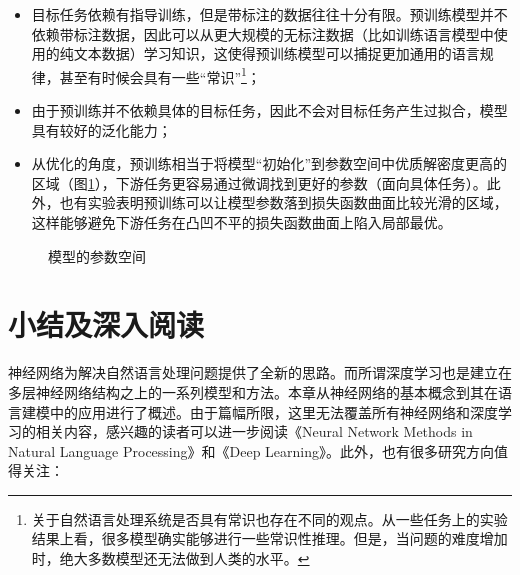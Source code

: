 \begin{itemize}
\vspace{0.5em}
\item 目标任务依赖有指导训练，但是带标注的数据往往十分有限。预训练模型并不依赖带标注数据，因此可以从更大规模的无标注数据（比如训练语言模型中使用的纯文本数据）学习知识，这使得预训练模型可以捕捉更加通用的语言规律，甚至有时候会具有一些``常识''\footnote{关于自然语言处理系统是否具有常识也存在不同的观点。从一些任务上的实验结果上看，很多模型确实能够进行一些常识性推理。但是，当问题的难度增加时，绝大多数模型还无法做到人类的水平。}；
\vspace{0.5em}
\item 由于预训练并不依赖具体的目标任务，因此不会对目标任务产生过拟合，模型具有较好的泛化能力；
\vspace{0.5em}
\item 从优化的角度，预训练相当于将模型``初始化''到参数空间中优质解密度更高的区域（图\ref{fig:5-73}），下游任务更容易通过微调找到更好的参数（面向具体任务）。此外，也有实验表明预训练可以让模型参数落到损失函数曲面比较光滑的区域，这样能够避免下游任务在凸凹不平的损失函数曲面上陷入局部最优。
\vspace{0.5em}
\end{itemize}

\begin{figure}[htp]
\centering

\caption{模型的参数空间}
\label{fig:5-73}
\end{figure}


\sectionnewpage
\section{小结及深入阅读}

\parinterval  神经网络为解决自然语言处理问题提供了全新的思路。而所谓深度学习也是建立在多层神经网络结构之上的一系列模型和方法。本章从神经网络的基本概念到其在语言建模中的应用进行了概述。由于篇幅所限，这里无法覆盖所有神经网络和深度学习的相关内容，感兴趣的读者可以进一步阅读《Neural Network Methods in Natural Language Processing》\cite{goldberg2017neural}和《Deep Learning》\cite{Goodfellow-et-al-2016}。此外，也有很多研究方向值得关注：

